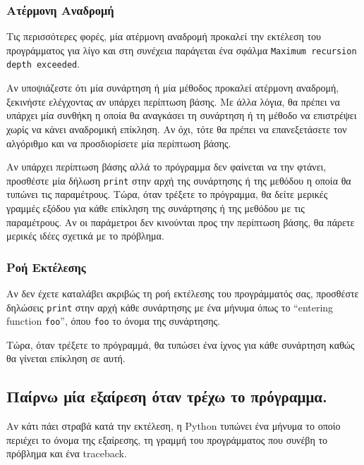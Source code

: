 \documentclass[10pt]{book}
\begin{document}
\subsubsection{Ατέρμονη Αναδρομή}

Τις περισσότερες φορές, μία ατέρμονη αναδρομή προκαλεί την εκτέλεση του προγράμματος για λίγο και στη συνέχεια παράγεται ένα σφάλμα  
{\tt Maximum recursion depth exceeded}.

 Αν υποψιάζεστε ότι μία συνάρτηση ή μία μέθοδος προκαλεί ατέρμονη αναδρομή, 
ξεκινήστε ελέγχοντας αν υπάρχει περίπτωση βάσης.  Με άλλα λόγια, θα πρέπει να 
υπάρχει μία συνθήκη η οποία θα αναγκάσει τη συνάρτηση ή τη μέθοδο να επιστρέψει 
χωρίς να κάνει αναδρομική επίκληση.  Αν όχι, τότε θα πρέπει να επανεξετάσετε τον 
αλγόριθμο και να προσδιορίσετε μία περίπτωση βάσης.

Αν υπάρχει περίπτωση βάσης αλλά το πρόγραμμα δεν φαίνεται να την φτάνει, προσθέστε 
μία δήλωση  {\tt print}  στην αρχή της συνάρτησης ή της μεθόδου η οποία θα τυπώνει τις παραμέτρους.  Τώρα, όταν τρέξετε το πρόγραμμα, θα δείτε μερικές γραμμές 
εξόδου για κάθε επίκληση της συνάρτησης ή της μεθόδου με τις παραμέτρους.  
Αν οι παράμετροι δεν κινούνται προς την περίπτωση βάσης, θα πάρετε μερικές ιδέες σχετικά με το πρόβλημα.


\subsubsection{Ροή Εκτέλεσης}

Αν δεν έχετε καταλάβει ακριβώς τη ροή εκτέλεσης του προγράμματός σας, προσθέστε δηλώσεις  {\tt print}  στην αρχή κάθε συνάρτησης με ένα μήνυμα όπως το  ``entering function {\tt foo}'',  όπου  {\tt foo}  το όνομα της συνάρτησης.

Τώρα, όταν τρέξετε το πρόγραμμά, θα τυπώσει ένα ίχνος για κάθε συνάρτηση καθώς 
θα γίνεται επίκληση σε αυτή.


\subsection{Παίρνω μία εξαίρεση όταν τρέχω το πρόγραμμα.}

Αν κάτι πάει στραβά κατά την εκτέλεση, η  Python  τυπώνει ένα μήνυμα το οποίο 
περιέχει το όνομα της εξαίρεσης, τη γραμμή του προγράμματος που συνέβη το πρόβλημα 
και ένα  traceback.
\end{document}

